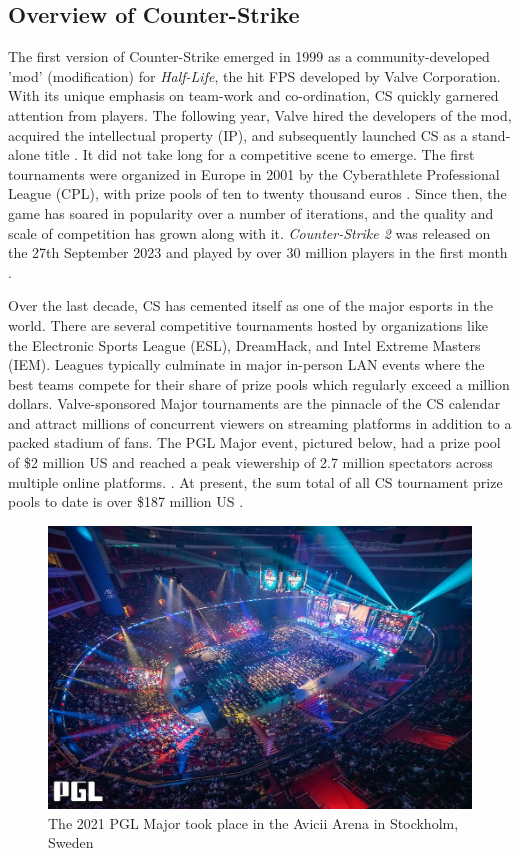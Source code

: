 \subsection{Overview of Counter-Strike}

The first version of Counter-Strike emerged in 1999 as a community-developed 'mod' (modification) for \textit{Half-Life}, the hit FPS developed by Valve Corporation. With its unique emphasis on team-work and co-ordination, CS quickly garnered attention from players. The following year, Valve hired the developers of the mod, acquired the intellectual property (IP), and subsequently launched CS as a stand-alone title \cite{retromag}. It did not take long for a competitive scene to emerge. The first tournaments were organized in Europe in 2001 by the Cyberathlete Professional League (CPL), with prize pools of ten to twenty thousand euros \cite{csmajors}. Since then, the game has soared in popularity over a number of iterations, and the quality and scale of competition has grown along with it. \textit{Counter-Strike 2} was released on the 27th September 2023 and played by over 30 million players in the first month \cite{cs2playercount}.

Over the last decade, CS has cemented itself as one of the major esports in the world. There are several competitive tournaments hosted by organizations like the Electronic Sports League (ESL), DreamHack, and Intel Extreme Masters (IEM). Leagues typically culminate in major in-person LAN events  where the best teams compete for their share of prize pools which regularly exceed a million dollars. Valve-sponsored Major tournaments are the pinnacle of the CS calendar and attract millions of concurrent viewers on streaming platforms in addition to a packed stadium of fans. The PGL Major event, pictured below, had a prize pool of \$2 million US and reached a peak viewership of 2.7 million spectators across multiple online platforms. \cite{pglliquipedia}\cite{pglarticle}. At present, the sum total of all CS tournament prize pools to date is over \$187 million US \cite{liquipedia-prizepool}.

\begin{figure}[h]
	\centering
	\includegraphics[width=\textwidth]{Figures/major.jpg}
	\caption{The 2021 PGL Major took place in the Avicii Arena in Stockholm, Sweden \cite{pglarticle}}
	\label{fig:major}
\end{figure}

